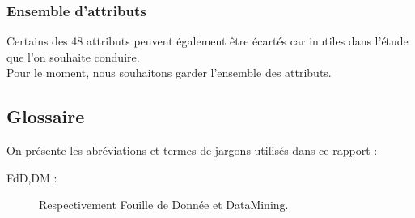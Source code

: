 \subsubsection{Ensemble d'attributs}
Certains des 48 attributs peuvent également être écartés car inutiles dans
l'étude que l'on souhaite conduire.\\
Pour le moment, nous souhaitons garder l'ensemble des attributs.


\subsection{Glossaire}

On présente les abréviations et termes de jargons utilisés dans ce rapport
:

\begin{description}
\item[FdD,DM : ] Respectivement Fouille de Donnée et DataMining.
\end{description}
